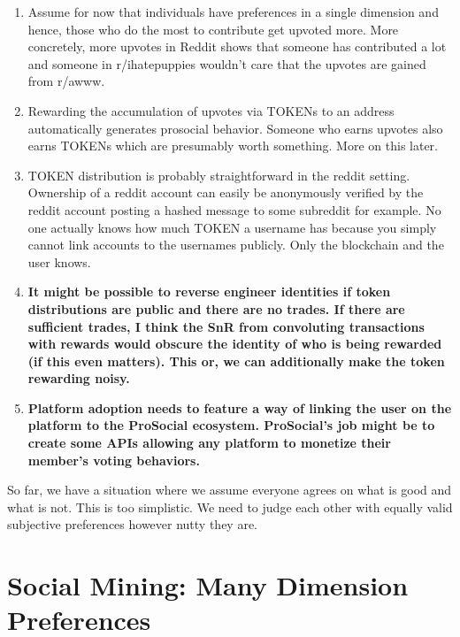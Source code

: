 \begin{enumerate}
	\item Assume for now that individuals have preferences in a single dimension and hence, those who do the most to contribute get upvoted more. More concretely, more upvotes in Reddit shows that someone has contributed a lot and someone in r/ihatepuppies wouldn't care that the upvotes are gained from r/awww.
	
	\item Rewarding the accumulation of upvotes via TOKENs to an address automatically generates prosocial behavior. Someone who earns upvotes also earns TOKENs which are presumably worth something. More on this later.
	
	\item TOKEN distribution is probably straightforward in the reddit setting. Ownership of a reddit account can easily be anonymously verified by the reddit account posting a hashed message to some subreddit for example. No one actually knows how much TOKEN a username has because you simply cannot link accounts to the usernames publicly. Only the blockchain and the user knows. 
	
	\item \textbf{It might be possible to reverse engineer identities if token distributions are public and there are no trades. If there are sufficient trades, I think the SnR from convoluting transactions with rewards would obscure the identity of who is being rewarded (if this even matters). This or, we can additionally make the token rewarding noisy.} 
	
	\item \textbf{Platform adoption needs to feature a way of linking the user on the platform to the ProSocial ecosystem. ProSocial's job might be to create some APIs allowing any platform to monetize their member's voting behaviors.}
	
\end{enumerate}

So far, we have a situation where we assume everyone agrees on what is good and what is not. This is too simplistic. We need to judge each other with equally valid subjective preferences however nutty they are.

\section*{Social Mining: Many Dimension Preferences}

